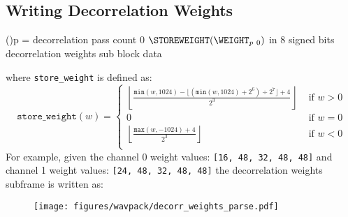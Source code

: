\subsection{Writing Decorrelation Weights}
\For(){p = decorrelation pass count \emph{\KwDownTo}0}{
  \WRITE $\texttt{\STOREWEIGHT}(\text{\WEIGHT}_{p~0})$ in 8 signed bits\;
}
\Return decorrelation weights sub block data\;
\EALGORITHM
\par
\noindent
where \texttt{store\_weight} is defined as:
\begin{equation*}
\texttt{store\_weight}(w) =
\begin{cases}
\left\lfloor\frac{\texttt{min}(w, 1024) - \lfloor(\texttt{min}(w,1024) + 2 ^ 6) \div 2 ^ 7\rfloor + 4}{2 ^ 3}\right\rfloor & \text{ if } w > 0 \\
0 & \text{ if } w = 0 \\
\left\lfloor \frac{\texttt{max}(w, -1024) + 4}{2 ^ 3} \right\rfloor & \text{ if } w < 0 \\
\end{cases}
\end{equation*}
For example, given the channel 0 weight values: \texttt{[16, 48, 32, 48, 48]}
\newline
and channel 1 weight values: \texttt{[24, 48, 32, 48, 48]}
\newline
the decorrelation weights subframe is written as:
\begin{figure}[h]
\texttt{[image: figures/wavpack/decorr\_weights\_parse.pdf]}
\end{figure}

\clearpage

